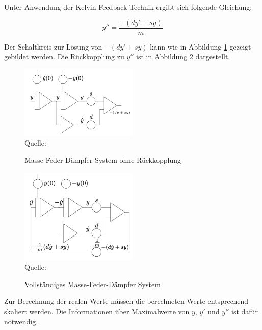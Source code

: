Unter Anwendung der Kelvin Feedback Technik ergibt sich folgende Gleichung:

\[y''=\frac{-(dy'+sy)}{m}\]

Der Schaltkreis zur Lösung von \(-(dy'+sy)\) kann wie in Abbildung \ref{fig:Feder-Masse-Dämpfer System} gezeigt gebildet werden. Die Rückkopplung zu \(y''\) ist in Abbildung \ref{fig:Feder-Masse-Dämpfer System mit Rückkopplung} dargestellt.

\begin{figure}[h]
  \caption{Masse-Feder-Dämpfer System ohne Rückkopplung}
  \includegraphics[width=0.5\textwidth]{abbildungen/feder_masse_daempfer.png}
  \\
  Quelle: \cite[S. 170]{Ulmann2022}
  \label{fig:Feder-Masse-Dämpfer System}
\end{figure}

\begin{figure}[h]
  \caption{Vollständiges Masse-Feder-Dämpfer System}
  \includegraphics[width=0.5\textwidth]{abbildungen/feder_masse_daempfer_mit_rueckkopplung.png}
  \\
  Quelle: \cite[S. 170]{Ulmann2022}
  \label{fig:Feder-Masse-Dämpfer System mit Rückkopplung}
\end{figure}

Zur Berechnung der realen Werte müssen die berechneten Werte entsprechend skaliert werden. Die Informationen über Maximalwerte von \(y\), \(y'\) und \(y''\) ist dafür notwendig.
